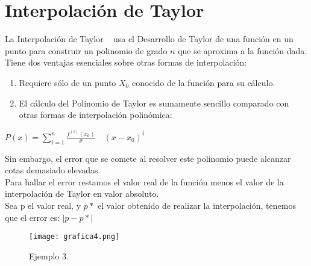 \documentclass[spanish,a4paper,11pt,twoside]{report}
\begin{document}
\section{Interpolación  de Taylor}
\label{2:sec:2}
  La Interpolación de Taylor ~\cite{Taylor} usa el Desarrollo de Taylor de una función en un punto para construir un polinomio de grado $n$ que se aproxima a la función dada. Tiene dos ventajas esenciales sobre otras formas de interpolación:
  \begin{enumerate}
  \item
  Requiere sólo de un punto $X_0$ conocido de la función para su cálculo.
  \item
  El cálculo del Polinomio de Taylor es sumamente sencillo comparado con otras formas de interpolación polinómica:
  \end{enumerate}

\begin{center}
$P(x)=\sum\limits_{i=1}^n\frac{f^{(i)} (x_0)}{i!}\quad(x - x_0)^i $
\end{center} 
Sin embargo, el error que se comete al resolver este polinomio puede alcanzar cotas demasiado elevadas.\\
Para hallar el error restamos el valor real de la función menos el valor de la interpolación de Taylor en valor absoluto.\\
Sea p el valor real, y $p*$ el valor obtenido de realizar la interpolación, tenemos que el error es: $|p-p*|$\\
\begin{figure}[h]
\begin{center}  
\texttt{[image: grafica4.png]} 
\caption{Ejemplo 3.}
\label{Ejemplo 3}
\end{center}  
\end{figure}
\end{document}
